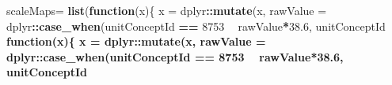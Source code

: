 \documentclass[
]{article}
\newenvironment{Shaded}{\begin{snugshade}}{\end{snugshade}}
\newcommand{\ControlFlowTok}[1]{\textcolor[rgb]{0.13,0.29,0.53}{\textbf{#1}}}
\newcommand{\DataTypeTok}[1]{\textcolor[rgb]{0.13,0.29,0.53}{#1}}
\newcommand{\DecValTok}[1]{\textcolor[rgb]{0.00,0.00,0.81}{#1}}
\newcommand{\FloatTok}[1]{\textcolor[rgb]{0.00,0.00,0.81}{#1}}
\newcommand{\KeywordTok}[1]{\textcolor[rgb]{0.13,0.29,0.53}{\textbf{#1}}}
\newcommand{\NormalTok}[1]{#1}
\newcommand{\OperatorTok}[1]{\textcolor[rgb]{0.81,0.36,0.00}{\textbf{#1}}}
\newcommand{\OtherTok}[1]{\textcolor[rgb]{0.56,0.35,0.01}{#1}}
\newcommand{\StringTok}[1]{\textcolor[rgb]{0.31,0.60,0.02}{#1}}
\begin{document}
\begin{Shaded}
\begin{Highlighting}[]
                                                          \DataTypeTok{scaleMaps=} \KeywordTok{list}\NormalTok{(}\ControlFlowTok{function}\NormalTok{(x)\{ x =}\StringTok{ }\NormalTok{dplyr}\OperatorTok{::}\KeywordTok{mutate}\NormalTok{(x, }\DataTypeTok{rawValue =}\NormalTok{ dplyr}\OperatorTok{::}\KeywordTok{case_when}\NormalTok{(unitConceptId }\OperatorTok{==}\StringTok{ }\DecValTok{8753} \OperatorTok{~}\StringTok{ }\NormalTok{rawValue}\OperatorTok{*}\FloatTok{38.6}\NormalTok{, unitConceptId }\OperatorTok{%in%}\StringTok{ }\KeywordTok{c}\NormalTok{(}\DecValTok{8840}\NormalTok{,}\DecValTok{8954}\NormalTok{,}\DecValTok{9028}\NormalTok{ ) }\OperatorTok{~}\StringTok{ }\NormalTok{rawValue, }\OtherTok{TRUE} \OperatorTok{~}\StringTok{ }\DecValTok{0}\NormalTok{)); x=}\StringTok{ }\NormalTok{dplyr}\OperatorTok{::}\KeywordTok{filter}\NormalTok{(x, rawValue }\OperatorTok{>=}\StringTok{ }\DecValTok{80} \OperatorTok{&}\StringTok{ }\NormalTok{rawValue }\OperatorTok{<=}\StringTok{ }\DecValTok{500}\NormalTok{ ); x =}\StringTok{ }\NormalTok{dplyr}\OperatorTok{::}\KeywordTok{mutate}\NormalTok{(x,}\DataTypeTok{valueAsNumber =} \KeywordTok{log}\NormalTok{(rawValue)); }\KeywordTok{return}\NormalTok{(x)\},}
                                                                          \ControlFlowTok{function}\NormalTok{(x)\{ x =}\StringTok{ }\NormalTok{dplyr}\OperatorTok{::}\KeywordTok{mutate}\NormalTok{(x, }\DataTypeTok{rawValue =}\NormalTok{ dplyr}\OperatorTok{::}\KeywordTok{case_when}\NormalTok{(unitConceptId }\OperatorTok{==}\StringTok{ }\DecValTok{8753} \OperatorTok{~}\StringTok{ }\NormalTok{rawValue}\OperatorTok{*}\FloatTok{38.6}\NormalTok{, unitConceptId }\OperatorTok{%in%}\StringTok{ }\KeywordTok{c}\NormalTok{(}\DecValTok{8840}\NormalTok{,}\DecValTok{8954}\NormalTok{,}\DecValTok{9028}\NormalTok{ ) }\OperatorTok{~}\StringTok{ }\NormalTok{rawValue, }\OtherTok{TRUE} \OperatorTok{~}\StringTok{ }\DecValTok{0}\NormalTok{)); x=}\StringTok{ }\NormalTok{dplyr}\OperatorTok{::}\KeywordTok{filter}\NormalTok{(x, rawValue }\OperatorTok{>=}\StringTok{ }\DecValTok{80} \OperatorTok{&}\StringTok{ }\NormalTok{rawValue }\OperatorTok{<=}\StringTok{ }\DecValTok{500}\NormalTok{ ); x =}\StringTok{ }\NormalTok{dplyr}\OperatorTok{::}\KeywordTok{mutate}\NormalTok{(x,}\DataTypeTok{valueAsNumber =} \KeywordTok{log}\NormalTok{(rawValue)}\OperatorTok{*}\KeywordTok{log}\NormalTok{(age)); }\KeywordTok{return}\NormalTok{(x)\},}
}}
\end{Highlighting}
\end{Shaded}
\end{document}
